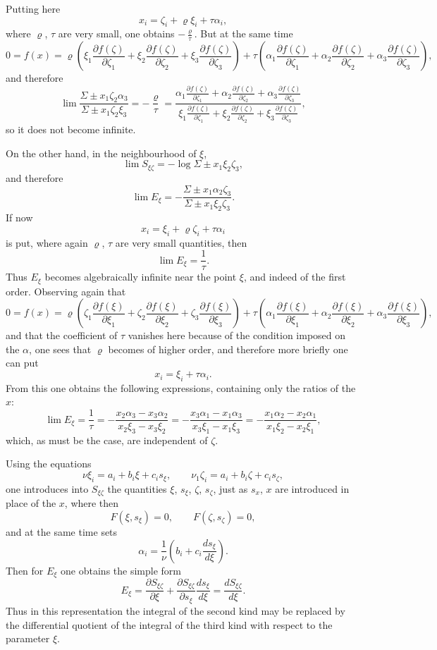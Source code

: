 \documentclass[10pt]{article}
\begin{document}
Putting here
\[
x_i=\zeta_i+\varrho\xi_i+\tau\alpha_i,
\]
where $\varrho$, $\tau$ are very small, one obtains $-\frac{\varrho}{\tau}$. But at the same time
\[
0=f(x)=\varrho\left(\xi_1\frac{\partial f(\zeta)}{\partial \zeta_1}+\xi_2\frac{\partial f(\zeta)}{\partial \zeta_2}+\xi_3\frac{\partial f(\zeta)}{\partial \zeta_3}\right)
+\tau\left(\alpha_1\frac{\partial f(\zeta)}{\partial \zeta_1}+\alpha_2\frac{\partial f(\zeta)}{\partial \zeta_2}+\alpha_3\frac{\partial f(\zeta)}{\partial \zeta_3}\right),
\]
and therefore
\[
\lim\frac{\Sigma\pm x_1\zeta_2\alpha_3}{\Sigma\pm x_1\zeta_2\xi_3}
=-\frac{\varrho}{\tau}
=\frac{\alpha_1\frac{\partial f(\zeta)}{\partial \zeta_1}+\alpha_2\frac{\partial f(\zeta)}{\partial \zeta_2}+\alpha_3\frac{\partial f(\zeta)}{\partial \zeta_3}}
{\xi_1\frac{\partial f(\zeta)}{\partial \zeta_1}+\xi_2\frac{\partial f(\zeta)}{\partial \zeta_2}+\xi_3\frac{\partial f(\zeta)}{\partial \zeta_3}},
\]
so it does not become infinite.

On the other hand, in the neighbourhood of $\xi$,
\[
\lim S_{\xi\zeta}=-\log\Sigma\pm x_1\xi_2\zeta_3,
\]
and therefore
\[
\lim E_\xi=-\frac{\Sigma\pm x_1\alpha_2\zeta_3}{\Sigma\pm x_1\xi_2\zeta_3}.
\]
If now
\[
x_i=\xi_i+\varrho\zeta_i+\tau\alpha_i
\]
is put, where again $\varrho$, $\tau$ are very small quantities, then
\[
\lim E_\xi=\frac{1}{\tau}.
\]
Thus $E_\xi$ becomes algebraically infinite near the point $\xi$, and indeed of the first order. Observing again that
\[
0=f(x)=\varrho\left(\zeta_1\frac{\partial f(\xi)}{\partial \xi_1}+\zeta_2\frac{\partial f(\xi)}{\partial \xi_2}+\zeta_3\frac{\partial f(\xi)}{\partial \xi_3}\right)
+\tau\left(\alpha_1\frac{\partial f(\xi)}{\partial \xi_1}+\alpha_2\frac{\partial f(\xi)}{\partial \xi_2}+\alpha_3\frac{\partial f(\xi)}{\partial \xi_3}\right),
\]
and that the coefficient of $\tau$ vanishes here because of the condition imposed on the $\alpha$, one sees that $\varrho$ becomes of higher order, and therefore more briefly one can put
\[
x_i=\xi_i+\tau\alpha_i.
\]
From this one obtains the following expressions, containing only the ratios of the $x$:
\[
\lim E_\xi=\frac{1}{\tau}
=-\frac{x_2\alpha_3-x_3\alpha_2}{x_2\xi_3-x_3\xi_2}
=-\frac{x_3\alpha_1-x_1\alpha_3}{x_3\xi_1-x_1\xi_3}
=-\frac{x_1\alpha_2-x_2\alpha_1}{x_1\xi_2-x_2\xi_1},
\]
which, as must be the case, are independent of $\zeta$.

Using the equations
\[
\nu\xi_i=a_i+b_i\xi+c_is_\xi,
\qquad
\nu_1\zeta_i=a_i+b_i\zeta+c_is_\zeta,
\]
one introduces into $S_{\xi\zeta}$ the quantities $\xi$, $s_\xi$, $\zeta$, $s_\zeta$, just as $s_x$, $x$ are introduced in place of the $x$, where then
\[
F(\xi,s_\xi)=0,
\qquad
F(\zeta,s_\zeta)=0,
\]
and at the same time sets
\[
\alpha_i=\frac{1}{\nu}\left(b_i+c_i\frac{ds_\xi}{d\xi}\right).
\]
Then for $E_\xi$ one obtains the simple form
\[
E_\xi=\frac{\partial S_{\xi\zeta}}{\partial \xi}+\frac{\partial S_{\xi\zeta}}{\partial s_\xi}\frac{ds_\xi}{d\xi}
=\frac{dS_{\xi\zeta}}{d\xi}.
\]
Thus in this representation the integral of the second kind may be replaced by the differential quotient of the integral of the third kind with respect to the parameter $\xi$.
\end{document}
